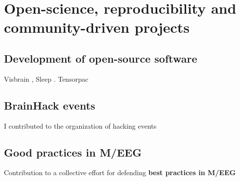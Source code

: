 \documentclass[a4paper,11pt]{article}
\begin{document}

\section{Open-science, reproducibility and community-driven projects}

\subsection{Development of open-source software}

Visbrain \citep{combrisson2019visbrain}, Sleep \citep{combrisson2017sleep}. Tensorpac \citep{combrisson2020tensorpac}

\subsection{BrainHack events}

I contributed to the organization of hacking events \citep{gau2021brainhack}

\subsection{Good practices in M/EEG}

Contribution to a collective effort for defending \textbf{best practices in M/EEG} \citep{nisoGoodScientificPractice2022}

\newpage
{}
{}

\begin{singlespace}
    
\end{singlespace}
\end{document}
